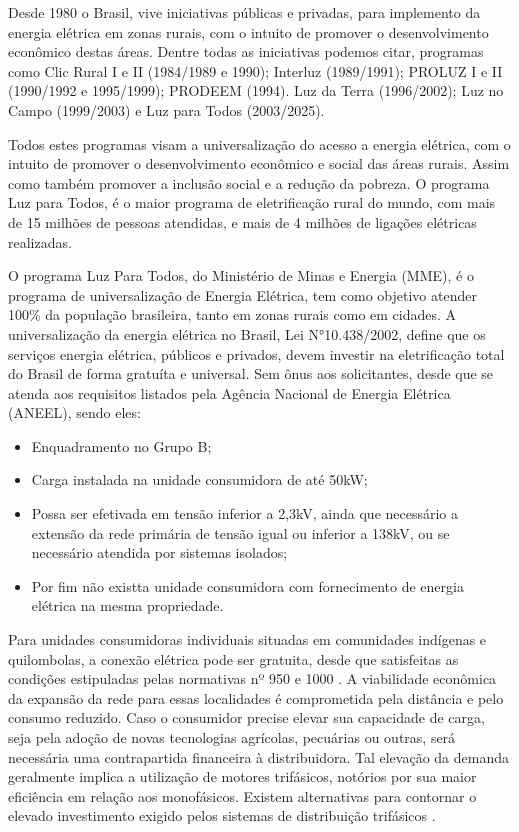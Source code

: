 \documentclass[oneside,openright,12pt]{ufsm_2021} %
\begin{document}
\par Desde 1980 o Brasil, vive iniciativas públicas e privadas, para implemento da energia elétrica em zonas rurais, com o intuito de promover o desenvolvimento econômico destas áreas. Dentre todas as iniciativas podemos citar, programas como Clic Rural I e II (1984/1989 e 1990); Interluz (1989/1991); PROLUZ I e II (1990/1992 e 1995/1999); PRODEEM (1994). Luz da Terra (1996/2002); Luz no Campo (1999/2003) e Luz para Todos (2003/2025).
\par Todos estes programas visam a universalização do acesso a energia elétrica, com o intuito de promover o desenvolvimento econômico e social das áreas rurais. Assim como também promover a inclusão social e a redução da pobreza. O programa Luz para Todos, é o maior programa de eletrificação rural do mundo, com mais de 15 milhões de pessoas atendidas, e mais de 4 milhões de ligações elétricas realizadas. 

\par O programa Luz Para Todos, do Ministério de Minas e Energia (MME), é o  programa de universalização de Energia Elétrica, tem como objetivo atender 100\% da população brasileira, tanto em zonas rurais como em cidades. A universalização da energia elétrica no Brasil, Lei N°10.438/2002, define que os serviços energia elétrica, públicos e privados, devem investir na eletrificação total do Brasil de forma gratuíta e universal. Sem ônus aos solicitantes, desde que se atenda aos requisitos listados pela Agência Nacional de Energia Elétrica (ANEEL), sendo eles:

\pagebreak

\begin{itemize}
	\item Enquadramento no Grupo B;
	\item Carga instalada na unidade consumidora de até 50kW;
	\item Possa ser efetivada em tensão inferior a 2,3kV, ainda que necessário a extensão da rede primária de tensão igual ou inferior a 138kV, ou se necessário atendida por sistemas isolados;
	\item Por fim não existta unidade consumidora com fornecimento de energia elétrica na mesma propriedade.
\end{itemize}

\par Para unidades consumidoras individuais situadas em comunidades indígenas e quilombolas, a conexão elétrica pode ser gratuita, desde que satisfeitas as condições estipuladas pelas normativas nº 950 e 1000 \cite{aneel_resolucao_2021}\cite{aneel_resolucao_2022}. A viabilidade econômica da expansão da rede para essas localidades é comprometida pela distância e pelo consumo reduzido. Caso o consumidor precise elevar sua capacidade de carga, seja pela adoção de novas tecnologias agrícolas, pecuárias ou outras, será necessária uma contrapartida financeira à distribuidora. Tal elevação da demanda geralmente implica a utilização de motores trifásicos, notórios por sua maior eficiência em relação aos monofásicos. Existem alternativas para contornar o elevado investimento exigido pelos sistemas de distribuição trifásicos \cite{fandi_sistema_2013}.
\end{document}
